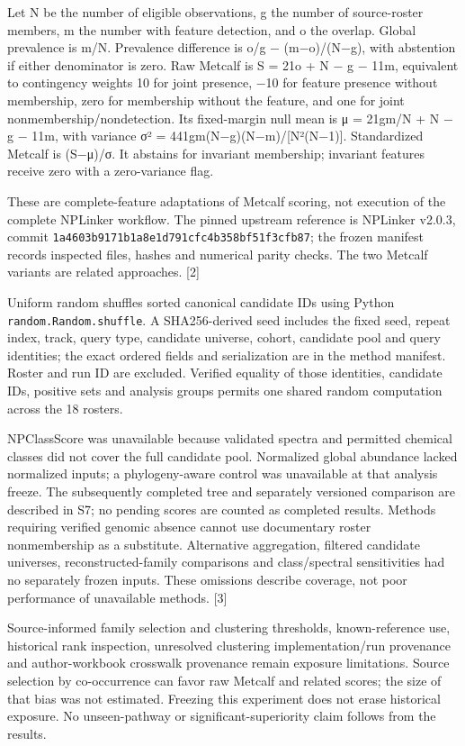 \documentclass[
  10pt,
  a4paper,
]{article}
\begin{document}
Let N be the number of eligible observations, g the number of source-roster members, m the number with feature detection, and o the overlap. Global prevalence is m/N. Prevalence difference is o/g − (m−o)/(N−g), with abstention if either denominator is zero. Raw Metcalf is S = 21o + N − g − 11m, equivalent to contingency weights 10 for joint presence, −10 for feature presence without membership, zero for membership without the feature, and one for joint nonmembership/nondetection. Its fixed-margin null mean is μ = 21gm/N + N − g − 11m, with variance σ² = 441gm(N−g)(N−m)/{[}N²(N−1){]}. Standardized Metcalf is (S−μ)/σ. It abstains for invariant membership; invariant features receive zero with a zero-variance flag.

These are complete-feature adaptations of Metcalf scoring, not execution of the complete NPLinker workflow. The pinned upstream reference is NPLinker v2.0.3, commit \nolinkurl{1a4603b9171b1a8e1d791cfc4b358bf51f3cfb87}; the frozen manifest records inspected files, hashes and numerical parity checks. The two Metcalf variants are related approaches. {[}2{]}

Uniform random shuffles sorted canonical candidate IDs using Python \texttt{random.Random.shuffle}. A SHA256-derived seed includes the fixed seed, repeat index, track, query type, candidate universe, cohort, candidate pool and query identities; the exact ordered fields and serialization are in the method manifest. Roster and run ID are excluded. Verified equality of those identities, candidate IDs, positive sets and analysis groups permits one shared random computation across the 18 rosters.

NPClassScore was unavailable because validated spectra and permitted chemical classes did not cover the full candidate pool. Normalized global abundance lacked normalized inputs; a phylogeny-aware control was unavailable at that analysis freeze. The subsequently completed tree and separately versioned comparison are described in S7; no pending scores are counted as completed results. Methods requiring verified genomic absence cannot use documentary roster nonmembership as a substitute. Alternative aggregation, filtered candidate universes, reconstructed-family comparisons and class/spectral sensitivities had no separately frozen inputs. These omissions describe coverage, not poor performance of unavailable methods. {[}3{]}

Source-informed family selection and clustering thresholds, known-reference use, historical rank inspection, unresolved clustering implementation/run provenance and author-workbook crosswalk provenance remain exposure limitations. Source selection by co-occurrence can favor raw Metcalf and related scores; the size of that bias was not estimated. Freezing this experiment does not erase historical exposure. No unseen-pathway or significant-superiority claim follows from the results.
\end{document}
